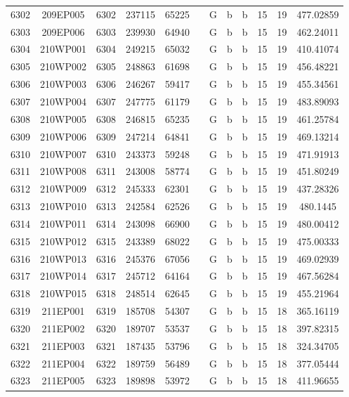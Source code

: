 \begin{tabular}{|*{12}{c|}}
6302 & 209EP005 & 6302 & 237115 & 65225 &  & G & b & b & 15 & 19 & 477.02859 \\ 
6303 & 209EP006 & 6303 & 239930 & 64940 &  & G & b & b & 15 & 19 & 462.24011 \\ 
6304 & 210WP001 & 6304 & 249215 & 65032 &  & G & b & b & 15 & 19 & 410.41074 \\ 
6305 & 210WP002 & 6305 & 248863 & 61698 &  & G & b & b & 15 & 19 & 456.48221 \\ 
6306 & 210WP003 & 6306 & 246267 & 59417 &  & G & b & b & 15 & 19 & 455.34561 \\ 
6307 & 210WP004 & 6307 & 247775 & 61179 &  & G & b & b & 15 & 19 & 483.89093 \\ 
6308 & 210WP005 & 6308 & 246815 & 65235 &  & G & b & b & 15 & 19 & 461.25784 \\ 
6309 & 210WP006 & 6309 & 247214 & 64841 &  & G & b & b & 15 & 19 & 469.13214 \\ 
6310 & 210WP007 & 6310 & 243373 & 59248 &  & G & b & b & 15 & 19 & 471.91913 \\ 
6311 & 210WP008 & 6311 & 243008 & 58774 &  & G & b & b & 15 & 19 & 451.80249 \\ 
6312 & 210WP009 & 6312 & 245333 & 62301 &  & G & b & b & 15 & 19 & 437.28326 \\ 
6313 & 210WP010 & 6313 & 242584 & 62526 &  & G & b & b & 15 & 19 & 480.1445 \\ 
6314 & 210WP011 & 6314 & 243098 & 66900 &  & G & b & b & 15 & 19 & 480.00412 \\ 
6315 & 210WP012 & 6315 & 243389 & 68022 &  & G & b & b & 15 & 19 & 475.00333 \\ 
6316 & 210WP013 & 6316 & 245376 & 67056 &  & G & b & b & 15 & 19 & 469.02939 \\ 
6317 & 210WP014 & 6317 & 245712 & 64164 &  & G & b & b & 15 & 19 & 467.56284 \\ 
6318 & 210WP015 & 6318 & 248514 & 62645 &  & G & b & b & 15 & 19 & 455.21964 \\ 
6319 & 211EP001 & 6319 & 185708 & 54307 &  & G & b & b & 15 & 18 & 365.16119 \\ 
6320 & 211EP002 & 6320 & 189707 & 53537 &  & G & b & b & 15 & 18 & 397.82315 \\ 
6321 & 211EP003 & 6321 & 187435 & 53796 &  & G & b & b & 15 & 18 & 324.34705 \\ 
6322 & 211EP004 & 6322 & 189759 & 56489 &  & G & b & b & 15 & 18 & 377.05444 \\ 
6323 & 211EP005 & 6323 & 189898 & 53972 &  & G & b & b & 15 & 18 & 411.96655 \\ 

\end{tabular}
